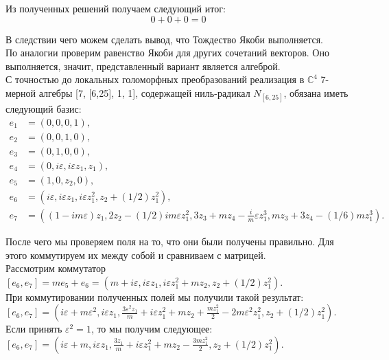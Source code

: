 \documentclass[12pt]{article}
\begin{document}
Из полученных решений получаем следующий итог:
\[
0 + 0 + 0 = 0
\]

В следствии чего можем сделать вывод, что Тождество Якоби выполняется. 
\\

По аналогии проверим равенство Якоби для других сочетаний векторов. Оно выполняется, значит, представленный вариант является алгеброй. 
\\

С точностью до локальных голоморфных преобразований реализация в $\mathbb{C}^4$ 7-мерной алгебры [7, [6,25], 1, 1], содержащей ниль-радикал $N_{[6,25]}$, обязана иметь следующий базис:
\begin{align*}
e_1 &= (0,0,0,1), \\
e_2 &= (0,0,1,0), \\
e_3 &= (0,1,0,0),\\
e_4 &= (0, i \varepsilon, i \varepsilon z_1, z_1), \\
e_5 &= (1, 0, z_2, 0), \\
e_6 &= (i \varepsilon, i \varepsilon z_1, i \varepsilon z_1^2, z_2 + (1/2)z_1^2), \\
e_7 &= ((1 - i m \varepsilon) z_1, 2 z_2 - (1/2) i m \varepsilon z_1^2, 3 z_3 + m z_4 - \frac{i}{m} \varepsilon z_1^3, m z_3 + 3 z_4 - (1/6) m z_1^3). 
\end{align*} 

После чего мы проверяем поля на то, что они были получены правильно. Для этого коммутируем их между собой и сравниваем с матрицей. \\

Рассмотрим коммутатор $[e_6, e_7] = me_5 + e_6 = (m + i \varepsilon, i \varepsilon z_1, i \varepsilon z_1^2 + mz_2, z_2 + (1/2)z_1^2)$. \\

При коммутировании полученных полей мы получили такой результат: \\

$[e_6, e_7] = \left(i \varepsilon + m \varepsilon^2, i \varepsilon z_1, \frac{3 \varepsilon^2 z_1}{m} + i \varepsilon z_1^2 + m z_2 + \frac{m z_1^2}{2} - 2 m \varepsilon^2 z_1^2, z_2 + (1/2)z_1^2 \right)$. \\

Если принять $\varepsilon^2 = 1$, то мы получим следующее: \\

$[e_6, e_7] = \left(i \varepsilon + m, i \varepsilon z_1, \frac{3 z_1}{m} + i \varepsilon z_1^2 + m z_2 - \frac{3m z_1^2}{2}, z_2 + (1/2)z_1^2 \right)$. \\
\end{document}
